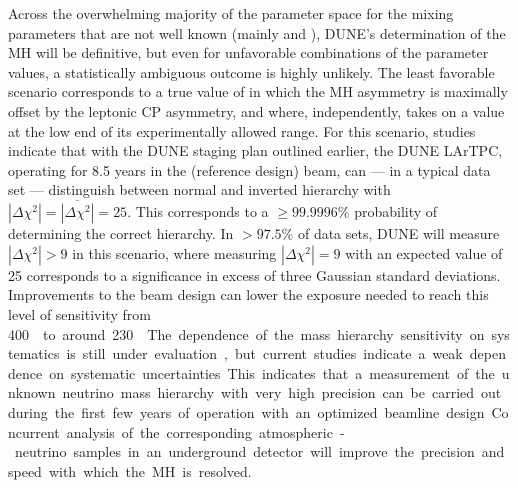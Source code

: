 Across the overwhelming majority of the parameter space for the mixing
parameters that are not well known (mainly \deltacp and
), DUNE's determination of the MH will be
definitive, but even for unfavorable combinations of the parameter
values, a statistically ambiguous outcome is highly unlikely.  The
least favorable scenario corresponds to a true value of \deltacp in
which the MH asymmetry is maximally offset by the leptonic CP
asymmetry, and where, independently,  takes on a
value at the low end of its experimentally allowed range.  For
this %
scenario, studies indicate that with the DUNE staging plan outlined earlier, the DUNE
LArTPC, operating for %
\num{8.5} years in the   (reference design) beam, 
can --- in a typical data set ---  distinguish between normal and inverted
hierarchy with $|\Delta \chi^2| = \overline{|\Delta \chi^2|} = 25$.
This corresponds to a $\geq 99.9996\%$ probability of determining the
correct hierarchy.  In $>97.5\%$ of data sets, DUNE will measure
$|\Delta \chi^2| > 9$ in this scenario, where measuring
$|\Delta\chi^2| = 9$ with an expected value of \num{25} corresponds to
a significance in excess of three Gaussian standard
deviations. Improvements to the beam design can lower the exposure
needed to reach this level of sensitivity from \SI{400}\ktMWyr{} to
around \SI{230}\ktMWyr. The dependence of the mass hierarchy
sensitivity on systematics is still under evaluation, but current
studies indicate a weak dependence on systematic uncertainties. This
indicates that a measurement of the unknown neutrino mass hierarchy
with very high precision can be carried out during the first few years
of operation with an optimized beamline design.

Concurrent analysis of the corresponding atmospheric-neutrino samples
in an underground detector will improve the precision and speed with
which the MH is resolved.


